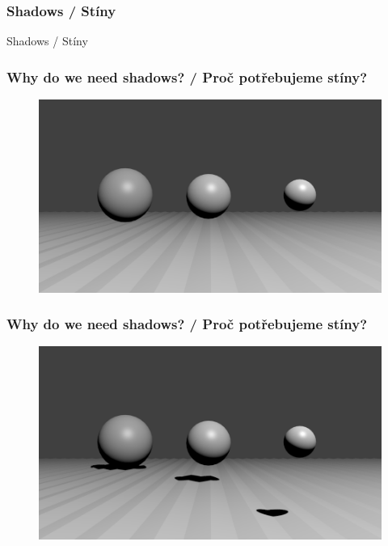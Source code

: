 \begin{frame}
\frametitle{Shadows / Stíny}
\begin{center}
\Huge {\color{white}Shadows / Stíny}
\end{center}
\end{frame}

\begin{frame}\frametitle{Why do we need shadows? / Proč potřebujeme stíny?}
  \begin{figure}[h]
    \includegraphics[width=11.5cm,keepaspectratio]{pics/shadows/whyShadows/noShadows}
  \end{figure}
\end{frame}

\begin{frame}\frametitle{Why do we need shadows? / Proč potřebujeme stíny?}
  \begin{figure}[h]
    \includegraphics[width=11.5cm,keepaspectratio]{pics/shadows/whyShadows/shadows}
  \end{figure}
\end{frame}

